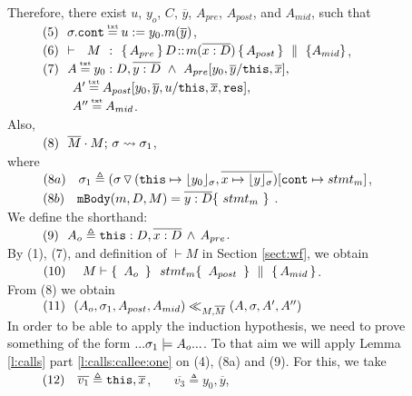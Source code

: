 \begin{description}
\item[{}]
 
 Therefore, there exist $u$, $y_o$, $C$, $\overline y$,  $A_{pre}$, $A_{post}$, and $A_{mid}$, such that \\
 $\SPS (5) \ \ \sigma.\prg{cont}\txteq u:=y_0.m(\overline y)$,\\
$\strut \ \ \hspace{0.5cm} \ \  (6) \  \ {\vdash \ \ M\ \ \mathbf{:}\ \  \{\, A_{pre}\, \}\, D\!::\!m(\overline{x:D})\, \{\, A_{post}\, \} \, \,\parallel\,\, \{ A_{mid} \}}$, \\
$\SPS (7) \  \ A \txteq y_0:D ,\overline {y:D}\ \wedge \  A_{pre}[y_0,\overline y/\prg{this},\overline x],$\\
$\SPSF  A'  \txteq A_{post}[y_0,\overline y, u/\prg{this},\overline x, \prg{res}],$\\ 
$\SPSF  A'' \txteq  A_{mid}$. 
\\
Also, \\
$\strut \ \ \hspace{0.5cm} \ \  (8) \ \ \overline{M}\cdot M;\, {\sigma} \rightsquigarrow \sigma_1$, \\
 where \\
$\strut \ \ \hspace{0.5cm} \ \  (8a) \ \ \ \sigma_1\triangleq ( \sigma \, {\triangledown}\,  (\mbox{\normalfont{\texttt{this}}}\mapsto {\lfloor y_0 \rfloor_{\sigma}},{\overline{x \mapsto {\lfloor y \rfloor_{\sigma}}}}) [\mbox{\normalfont{\texttt{cont}}}\mapsto stmt_m]$, \\ 
$\SPS (8b) \ \ \   \prg{mBody}(m,D,M)=\overline{y:D}\{\    stmt_m\ \}$ .\\
We define the shorthand:\\
$\strut \ \ \hspace{0.5cm} \ \  (9) \ \  A_{o} \triangleq  \mbox{\normalfont{\texttt{this}}}:D,\overline{x:D}\, \wedge\, A_{pre}$.
\\
By (1), (7), and definition of $\vdash M$ in Section \ref{sect:wf}, we obtain\\
$\SPS (10) \ \ \ \ M \vdash  \quadruple { \ \Ao \  } {\ stmt_m } {\ A_{post}\ } {A_{mid}}$.\\
From (8) we obtain\\  
$\strut \ \ \hspace{0.5cm} \ \  (11) \ \ (A_{o},\sigma_1,A_{post}, A_{mid}) \ll_{M,\overline{M}} (A,\sigma,A', A'')$
\\
In order to be able to apply the induction hypothesis, we need to prove something of the form $... \sigma_1 \models A_{o} ...$. To that aim we will apply Lemma   \ref{l:calls} part \ref{l:calls:callee:one} on (4), (8a) and (9). For this, we take
\\
$\strut \ \ \hspace{0.5cm} \ \  (12) \ \ \ \overline {v_1} \triangleq \mbox{\normalfont{\texttt{this}}},\overline x$, \ \ \ 
$\overline {v_3} \triangleq  y_0,\overline y$,\ \ \ 

\end{description}
